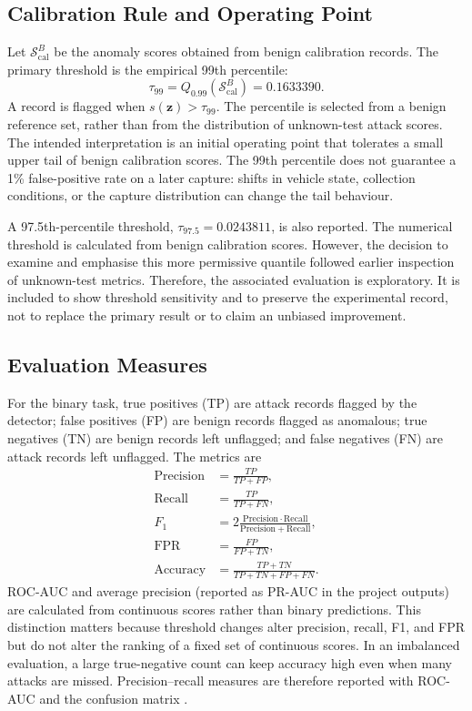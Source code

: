\documentclass[journal]{IEEEtran}
\begin{document}
\subsection{Calibration Rule and Operating Point}
Let $\mathcal{S}_{\mathrm{cal}}^{B}$ be the anomaly scores obtained from benign calibration records. The primary threshold is the empirical 99th percentile:
\begin{equation}
  \tau_{99}=Q_{0.99}(\mathcal{S}_{\mathrm{cal}}^{B})=0.1633390.
  \label{eq:q99}
\end{equation}
A record is flagged when $s(\mathbf{z})>\tau_{99}$. The percentile is selected from a benign reference set, rather than from the distribution of unknown-test attack scores. The intended interpretation is an initial operating point that tolerates a small upper tail of benign calibration scores. The 99th percentile does not guarantee a 1\% false-positive rate on a later capture: shifts in vehicle state, collection conditions, or the capture distribution can change the tail behaviour.

A 97.5th-percentile threshold, $\tau_{97.5}=0.0243811$, is also reported. The numerical threshold is calculated from benign calibration scores. However, the decision to examine and emphasise this more permissive quantile followed earlier inspection of unknown-test metrics. Therefore, the associated evaluation is exploratory. It is included to show threshold sensitivity and to preserve the experimental record, not to replace the primary result or to claim an unbiased improvement.

\subsection{Evaluation Measures}
For the binary task, true positives (TP) are attack records flagged by the detector; false positives (FP) are benign records flagged as anomalous; true negatives (TN) are benign records left unflagged; and false negatives (FN) are attack records left unflagged. The metrics are
\begin{align}
 \mathrm{Precision}&=\frac{TP}{TP+FP},\\
 \mathrm{Recall}&=\frac{TP}{TP+FN},\\
 F_1&=2\frac{\mathrm{Precision}\cdot\mathrm{Recall}}{\mathrm{Precision}+\mathrm{Recall}},\\
 \mathrm{FPR}&=\frac{FP}{FP+TN},\\
 \mathrm{Accuracy}&=\frac{TP+TN}{TP+TN+FP+FN}.
\end{align}
ROC-AUC and average precision (reported as PR-AUC in the project outputs) are calculated from continuous scores rather than binary predictions. This distinction matters because threshold changes alter precision, recall, F1, and FPR but do not alter the ranking of a fixed set of continuous scores. In an imbalanced evaluation, a large true-negative count can keep accuracy high even when many attacks are missed. Precision--recall measures are therefore reported with ROC-AUC and the confusion matrix \cite{davis2006prroc}.
\end{document}
